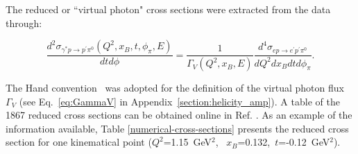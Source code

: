 \documentclass[prc,floatfix,twocolumn,superscriptaddress,letter]{revtex4}
\begin{document}
The reduced or ``virtual photon"  cross sections  were extracted from the data through:

\begin{widetext}
\begin{equation}
\frac{d^2\sigma_{\gamma^* p \rightarrow p^\prime \pi^0} (Q^2, x_B,t,\phi_\pi, E)}{dt d\phi} = 
\frac{1}{\Gamma_V(Q^2,x_B,E)} 
\frac{d^4\sigma_{ep\rightarrow e^\prime p^\prime \pi^0}}{dQ^2 dx_B dt d\phi_\pi}.
\end{equation}
\end{widetext} 

\noindent
The Hand convention~\cite{Hand} was adopted for the
definition of the virtual photon flux $\Gamma_V$ (see Eq.~\ref{eq:GammaV} in  Appendix~\ref{section:helicity_amp}). 
A table of  the 1867 reduced cross sections   can be obtained online in Ref. \cite{full_table}. 
As an example of the information available, Table \ref{numerical-cross-sections} presents the reduced cross section for one kinematical point ($Q^2$=1.15~GeV$^2$, ~$x_B$=0.132,~$t$=-0.12~GeV$^2$). 
\end{document}
